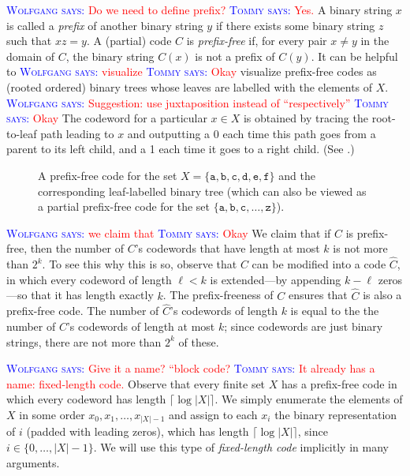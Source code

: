 \documentclass{patmorin}
\newcommand{\aremark}[3]{\textcolor{blue}{\textsc{#1 #2:}}
  \textcolor{red}{\textsf{#3}}}
\newcommand{\tommy}[2][says]{\aremark{Tommy}{#1}{#2}}
\newcommand{\wolfgang}[2][says]{\aremark{Wolfgang}{#1}{#2}}
\begin{document}
\wolfgang{Do we need to define prefix?} \tommy{Yes.}  A binary string
$x$ is called a \emph{prefix} of another binary string $y$ if there
exists some binary string $z$ such that $xz = y$. A (partial) code $C$
is \emph{prefix-free} if, for every pair $x\neq y$ in the domain of
$C$, the binary string $C(x)$ is not a prefix of $C(y)$.  It can be
helpful to \wolfgang{visualize} \tommy{Okay} visualize prefix-free
codes as (rooted ordered) binary trees whose leaves are labelled with
the elements of $X$. \wolfgang{Suggestion: use juxtaposition instead
  of ``respectively''} \tommy{Okay} The codeword for a particular
$x\in X$ is obtained by tracing the root-to-leaf path leading to $x$
and outputting a 0 each time this path goes from a parent to its left
child, and a 1 each time it goes to a right child. (See
.)

\begin{figure}
  \caption{A prefix-free code for the set
    $X=\{\mathtt{a},\mathtt{b},\mathtt{c},\mathtt{d},\mathtt{e},\mathtt{f}\}$
    and the corresponding leaf-labelled binary tree (which can also be
    viewed as a partial prefix-free code for the set
    $\{\mathtt{a},\mathtt{b},\mathtt{c},\ldots,\mathtt{z}\}$).}
\end{figure}

\wolfgang{we claim that} \tommy{Okay}
We claim that if $C$ is prefix-free, then the
number of $C$'s codewords that have length at most $k$ is not more
than $2^k$. To see this why this is so, observe that $C$ can be
modified into a code $\hat C$, in which every codeword of length
$\ell <k$ is extended---by appending $k-\ell$ zeros---so that it has
length exactly $k$. The prefix-freeness of $C$ ensures that $\hat C$
is also a prefix-free code. The number of $\hat C$'s codewords of
length $k$ is equal to the the number of $C$'s codewords of length at
most $k$; since codewords are just binary strings, there are not more
than $2^k$ of these.

\wolfgang{Give it a name? ``block code?} \tommy{It already has a name: fixed-length code.}
Observe that every finite set $X$ has a prefix-free code in which
every codeword has length $\lceil\log |X|\rceil$. We simply enumerate
the elements of $X$ in some order $x_0,x_1,\ldots,x_{|X|-1}$ and
assign to each $x_i$ the binary representation of $i$ (padded with
leading zeros), which has length $\lceil\log |X|\rceil$, since
$i\in\{0,\ldots,|X|-1\}$.  We will use this type of \emph{fixed-length
code} implicitly in many arguments.
\end{document}
